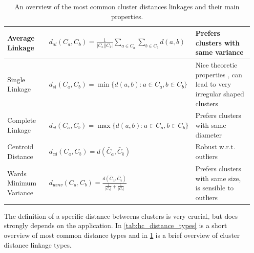 \begin{table}
\begin{scriptsize}
\begin{tabular}{ |l|l|p{5cm}|}
    \hline
    Average Linkage \citep{sokal_1958_science_bulletin}           
        & $d_{al}(C_a,C_b) = \frac{1}{|C_a||C_b|} \sum _{a \in C_a} \sum_{b \in C_b} d(a,b) $ 
        & \scriptsize Prefers clusters with same variance \cite{sokal_1958_science_bulletin} \\ \hline

    Single Linkage \citep{florek_1951}            
        & $d_{sl}(C_a,C_b) =  \min\{d(a,b) : a \in C_a, b \in C_b\}$ 
        & Nice theoretic properties \citep{hartigan_1981_jjamstat,milligan_1980_psycho}, can lead
          to very irregular shaped clusters \\ \hline
    Complete Linkage \citep{sorensen_1948}         
        & $d_{cl}(C_a,C_b) =  \max\{d(a,b) : a \in C_a, b \in C_b\}$ 
        & Prefers clusters with same diameter \citep{milligan_1980_psycho} \\ \hline
    Centroid Distance         
        & $d_{cd}(C_a,C_b) =  d(\bar{C}_a,\bar{C}_b) $ 
        & Robust w.r.t. outliers \citep{milligan_1980_psycho} \\ \hline
    Wards Minimum Variance \citep{ward_63_jasa}
        & $d_{wmv}(C_a,C_b) = \frac{ d(\bar{C}_a,\bar{C}_b)}{ \frac{1}{|C_a|} + \frac{1}{|C_b|} } $ 
        & Prefers clusters with same size, is sensible to outliers \citep{milligan_1980_psycho} \\ \hline
\end{tabular}

\end{scriptsize}

\caption{
    An overview of the most common cluster distances linkages and their main properties.
}\label{tab:hc_linkage_types}
\end{table}


The definition of a specific distance betweens clusters is very crucial, 
but does strongly depends on the application.
In \cref{tab:hc_distance_types} is a short overview of most common distance
types and in   \cref{tab:hc_linkage_types} is a  brief overview 
of cluster distance linkage types.








